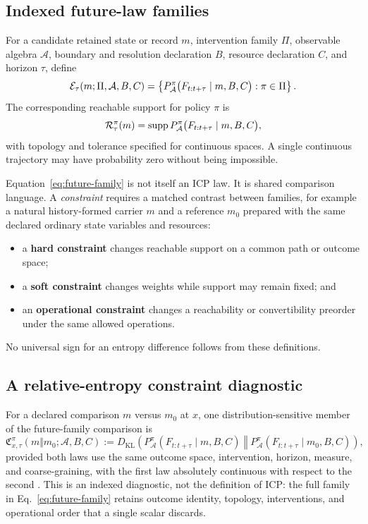 \subsection{Indexed future-law families}

For a candidate retained state or record $m$, intervention family $\Pi$,
observable algebra $\mathcal A$, boundary and resolution declaration $B$,
resource declaration $C$, and horizon $\tau$, define
\begin{equation}
 \mathcal{E}_{\tau}(m;\Pi,\mathcal A,B,C)
 =\left\{P^{\pi}_{\mathcal A}
   \bigl(F_{t:t+\tau}\mid m,B,C\bigr):\pi\in\Pi\right\}.
 \label{eq:future-family}
\end{equation}
The corresponding reachable support for policy $\pi$ is
\begin{equation}
 \mathcal{R}^{\pi}_{\tau}(m)=
 \operatorname{supp}P^{\pi}_{\mathcal A}
 \bigl(F_{t:t+\tau}\mid m,B,C\bigr),
 \label{eq:reachable-support}
\end{equation}
with topology and tolerance specified for continuous spaces. A single
continuous trajectory may have probability zero without being impossible.

Equation~\eqref{eq:future-family} is not itself an ICP law. It is shared
comparison language. A \emph{constraint} requires a matched contrast between
families, for example a natural history-formed carrier $m$ and a reference
$m_0$ prepared with the same declared ordinary state variables and resources:
\begin{itemize}
  \item a \textbf{hard constraint} changes reachable support on a common path
  or outcome space;
  \item a \textbf{soft constraint} changes weights while support may remain
  fixed; and
  \item an \textbf{operational constraint} changes a reachability or
  convertibility preorder under the same allowed operations.
\end{itemize}
No universal sign for an entropy difference follows from these definitions.

\subsection{A relative-entropy constraint diagnostic}

For a declared comparison $m$ versus $m_0$ at $x$, one distribution-sensitive member
of the future-family comparison is
\begin{equation}
 \mathfrak C_{x,\tau}^{\pi}
 (m\Vert m_0;\mathcal A,B,C)
 :=D_{\mathrm{KL}}\!\left(
 P^{\pi}_{\mathcal A}(F_{t:t+\tau}\mid m,B,C)
 \middle\Vert
 P^{\pi}_{\mathcal A}(F_{t:t+\tau}\mid m_0,B,C)
 \right),
 \label{eq:icp-constraint-divergence}
\end{equation}
provided both laws use the same outcome space, intervention, horizon, measure,
and coarse-graining, with the first law absolutely continuous with respect to
the second \citep{KullbackLeibler1951Information}. This is an indexed diagnostic,
not the definition of ICP: the full family in Eq.~\eqref{eq:future-family}
retains outcome identity, topology, interventions, and operational order that a
single scalar discards.

